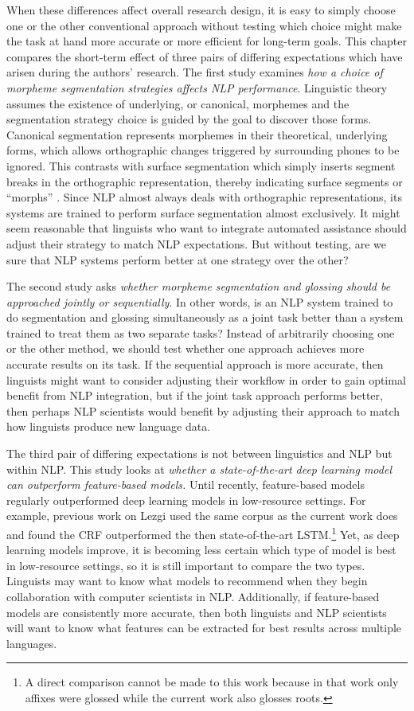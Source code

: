 When these differences affect overall research design, it is easy to simply choose one or the other conventional approach without testing which choice might make the task at hand more accurate or more efficient for long-term goals. This chapter compares the short-term effect of three pairs of differing expectations which have arisen during the authors' research. 
The first study examines \textit{how a choice of morpheme segmentation strategies affects NLP performance}. Linguistic theory assumes the existence of underlying, or canonical, morphemes and the segmentation strategy choice is guided by the goal to discover those forms. Canonical segmentation represents morphemes in their theoretical, underlying forms, which allows orthographic changes triggered by surrounding phones to be ignored. This contrasts with surface segmentation which simply inserts segment breaks in the orthographic representation, thereby indicating surface segments or ``morphs'' \citep{virpioja_empirical_2011}. Since NLP almost always deals with orthographic representations, its systems are trained to perform surface segmentation almost exclusively. 
It might seem reasonable that linguists who want to integrate automated assistance should adjust their strategy to match NLP expectations. But without testing, are we sure that NLP systems perform better at one strategy over the other?

The second study asks \textit{whether morpheme segmentation and glossing should be approached jointly or sequentially}. In other words, is an NLP system trained to do segmentation and glossing simultaneously as a joint task better than a system trained to treat them as two separate tasks? Instead of arbitrarily choosing one or the other method, we should test whether one approach achieves more accurate results on its task. If the sequential approach is more accurate, then linguists might want to consider adjusting their workflow in order to gain optimal benefit from NLP integration, but if the joint task approach performs better, then perhaps NLP scientists would benefit by adjusting their approach to match how linguists produce new language data.

The third pair of differing expectations is not between linguistics and NLP but within NLP. This study looks at \textit{whether a state-of-the-art deep learning model can outperform feature-based models.} Until recently, feature-based models regularly outperformed deep learning models in low-resource settings. For example, previous work on Lezgi \citep{moeller_automatic_2018} used the same corpus as the current work does and found the CRF outperformed the then state-of-the-art LSTM.\footnote{A direct comparison cannot be made to this work because in that work only affixes were glossed while the current work also glosses roots.} Yet, as deep learning models improve, it is becoming less certain which type of model is best in low-resource settings, so it is still important to compare the two types. Linguists may want to know what models to recommend when they begin collaboration with computer scientists in NLP. Additionally, if feature-based models are consistently more accurate, then both linguists and NLP scientists will want to know what features can be extracted for best results across multiple languages. 

